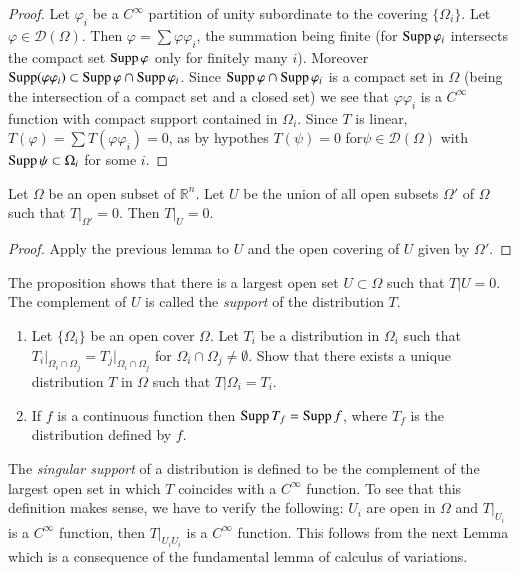 \begin{proof}
Let $\varphi_{i}$ be a $C^{\infty}$ partition of unity subordinate to the covering $\{\Omega_{i}\}$. Let $\varphi\in \mathcal{D}(\Omega)$. Then $\varphi=\sum \varphi \varphi_{i}$, the summation being finite (for $\operatorname{Supp} \varphi_{i}$ intersects the compact set $\operatorname{Supp} \varphi$ only for finitely many $i$). Moreover $\operatorname{Supp} (\varphi \varphi_{i})\subset \operatorname{Supp} \varphi \cap \operatorname{Supp} \varphi_{i}$. Since $\operatorname{Supp} \varphi \cap \operatorname{Supp} \varphi_{i}$ is a compact set in $\Omega$ (being the intersection of a compact set and a closed set) we see that $\varphi\varphi_{i}$ is a $C^{\infty}$ function with compact support contained in $\Omega_{i}$. Since $T$ is linear, $T(\varphi)=\sum T(\varphi \varphi_{i})=0$, as by hypothes $T(\psi)=0$ for\pageoriginale $\psi\in \mathcal{D}(\Omega)$ with $\operatorname{Supp} \psi \subset \Omega_{i}$ for some $i$.
\end{proof}

\begin{proposition}
Let $\Omega$ be an open subset of $\mathbb{R}^{n}$. Let $U$ be the union of all open subsets $\Omega'$ of $\Omega$ such that $T|_{\Omega'}=0$. Then $T|_{U}=0$.
\end{proposition}

\begin{proof}
Apply the previous lemma to $U$ and the open covering of $U$ given by $\Omega'$.
\end{proof}

The proposition shows that there is a largest open set $U\subset \Omega$ such that $T|U=0$. The complement of $U$ is called the {\em support} of the distribution $T$.

\begin{exers*}
\begin{enumerate}
\renewcommand{\labelenumi}{(\theenumi)}
\item Let $\{\Omega_{i}\}$ be an open cover $\Omega$. Let $T_{i}$ be a distribution in $\Omega_{i}$ such that $T_{i}\big|_{\Omega_{i}\cap \Omega_{j}}=T_{j}\big|_{\Omega_{i}\cap \Omega_{j}}$ for $\Omega_{i}\cap \Omega_{j}\neq \emptyset$. Show that there exists a unique distribution $T$ in $\Omega$ such that $T|\Omega_{i}=T_{i}$.

\item If $f$ is a continuous function then $\operatorname{Supp} T_{f}=\operatorname{Supp} f$, where $T_{f}$ is the distribution defined by $f$.
\end{enumerate}
\end{exers*}

The {\em singular support} of a distribution is defined to be the complement of the largest open set in which $T$ coincides with a $C^{\infty}$ function. To see that this definition makes sense, we have to verify the following: $U_{i}$ are open in $\Omega$ and $T|_{U_{i}}$ is a $C^{\infty}$ function, then $T|_{U_{i}U_{i}}$ is a $C^{\infty}$ function. This follows from the next Lemma which is a consequence of the fundamental lemma of calculus of variations.


